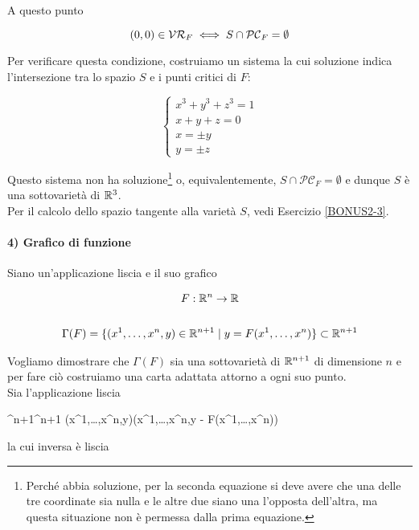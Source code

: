 A questo punto

\begin{equation}
	(0,0) \in \mathcal{VR}_{F} \iff S \cap \mathcal{PC}_{F} = \emptyset
\end{equation}

Per verificare questa condizione, costruiamo un sistema la cui soluzione indica l'intersezione tra lo spazio $ S $ e i punti critici di $ F $:

\begin{equation}
	\begin{cases}
		x^{3} + y^{3} + z^{3} = 1 \\
		x+y+z=0 \\
		x = \pm y \\
		y = \pm z
	\end{cases}
\end{equation}

Questo sistema non ha soluzione\footnote{%
	Perché abbia soluzione, per la seconda equazione si deve avere che una delle tre coordinate sia nulla e le altre due siano una l'opposta dell'altra, ma questa situazione non è permessa dalla prima equazione.%
} o, equivalentemente, $ S \cap \mathcal{PC}_{F} = \emptyset $ e dunque $ S $ è una sottovarietà di $ \mathbb{R}^{3} $. \\
Per il calcolo dello spazio tangente alla varietà $ S $, vedi Esercizio \ref{BONUS2-3}.

\paragraph{4) Grafico di funzione}

Siano un'applicazione liscia e il suo grafico

\begin{gather}
	F : \mathbb{R}^{n} \to \mathbb{R} \\
	\nonumber \\
	\Gamma(F) = \{ (x^{1},\dots,x^{n},y) \in \mathbb{R}^{n+1} \mid y = F(x^{1},\dots,x^{n}) \} \subset \mathbb{R}^{n+1}
\end{gather}

Vogliamo dimostrare che $ \Gamma(F) $ sia una sottovarietà di $ \mathbb{R}^{n+1} $ di dimensione $ n $ e per fare ciò costruiamo una carta adattata attorno a ogni suo punto. \\
Sia l'applicazione liscia

\map{\varphi}
	{\R^{n+1}}{\R^{n+1}}
	{(x^{1},\dots,x^{n},y)}{(x^{1},\dots,x^{n},y - F(x^{1},\dots,x^{n}))}

la cui inversa è liscia

